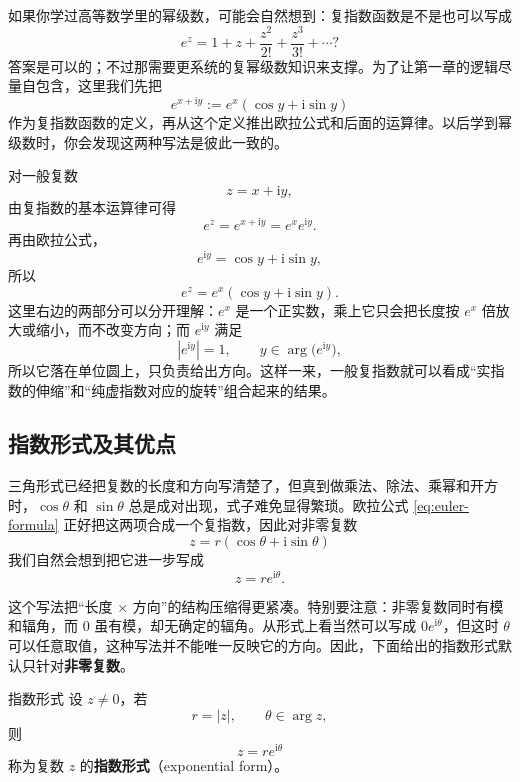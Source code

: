 \begin{tishi}[关于复指数定义的一点说明]
如果你学过高等数学里的幂级数，可能会自然想到：复指数函数是不是也可以写成
\[
e^z=1+z+\frac{z^2}{2!}+\frac{z^3}{3!}+\cdots?
\]
答案是可以的；不过那需要更系统的复幂级数知识来支撑。为了让第一章的逻辑尽量自包含，这里我们先把
\[
e^{x+\mathrm{i}y}:=e^x(\cos y+\mathrm{i}\sin y)
\]
作为复指数函数的定义，再从这个定义推出欧拉公式和后面的运算律。以后学到幂级数时，你会发现这两种写法是彼此一致的。
\end{tishi}

\begin{zhu}{}{}
对一般复数
\[
z=x+\mathrm{i}y,
\]
由复指数的基本运算律可得
\[
e^z=e^{x+\mathrm{i}y}=e^x e^{\mathrm{i}y}.
\]
再由欧拉公式，
\[
e^{\mathrm{i}y}=\cos y+\mathrm{i}\sin y,
\]
所以
\[
e^z=e^x(\cos y+\mathrm{i}\sin y).
\]
这里右边的两部分可以分开理解：$e^x$ 是一个正实数，乘上它只会把长度按 $e^x$ 倍放大或缩小，而不改变方向；而 $e^{\mathrm{i}y}$ 满足
\[
|e^{\mathrm{i}y}|=1,\qquad y\in \arg\bigl(e^{\mathrm{i}y}\bigr),
\]
所以它落在单位圆上，只负责给出方向。这样一来，一般复指数就可以看成``实指数的伸缩''和``纯虚指数对应的旋转''组合起来的结果。
\end{zhu}



\subsection{指数形式及其优点}

三角形式已经把复数的长度和方向写清楚了，但真到做乘法、除法、乘幂和开方时，$\cos\theta$ 和 $\sin\theta$ 总是成对出现，式子难免显得繁琐。欧拉公式 \eqref{eq:euler-formula} 正好把这两项合成一个复指数，因此对非零复数
\[
z=r(\cos\theta+\mathrm{i}\sin\theta)
\]
我们自然会想到把它进一步写成
\begin{equation}
    z=re^{\mathrm{i}\theta}.
\end{equation}

这个写法把``长度 $\times$ 方向''的结构压缩得更紧凑。特别要注意：非零复数同时有模和辐角，而 $0$ 虽有模，却无确定的辐角。从形式上看当然可以写成 $0e^{\mathrm{i}\theta}$，但这时 $\theta$ 可以任意取值，这种写法并不能唯一反映它的方向。因此，下面给出的指数形式默认只针对\textbf{非零复数}。

\begin{dingliyi}{指数形式}{}
设 $z\neq 0$，若
\[
r=|z|,\qquad \theta\in \arg z,
\]
则
\begin{equation}\label{eq:exp-form}
    z=re^{\mathrm{i}\theta}
\end{equation}
称为复数 $z$ 的\textbf{指数形式}（exponential form）。
\end{dingliyi}

